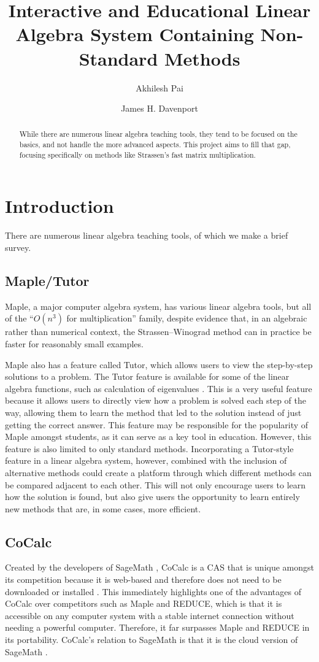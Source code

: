 \documentclass[natbib]{llncs}
\title{Interactive and Educational Linear Algebra System Containing Non-Standard Methods}
\author{Akhilesh Pai\inst{1} \and James H. Davenport\inst{1}}
\institute{
  University of Bath, Bath BA2 7AY, UK\\
  \email{abp43@bath.ac.uk}\\ \email{J.H.Davenport@bath.ac.uk} 
}
\begin{document}
\maketitle

\begin{abstract}
While there are numerous linear algebra teaching tools, they tend to be focused on the basics, and not handle the more advanced aspects. This project aims to fill that gap, focusing specifically on methods like Strassen's fast matrix multiplication.
\end{abstract}
\section{Introduction}
There are numerous linear algebra teaching tools, of which we make a brief survey.
\subsection{Maple/Tutor}
Maple, a major computer algebra system, has various linear algebra tools, but all of the ``$O(n^3)$ for multiplication'' family, despite evidence \cite{Tonksetal2017a} that, in an algebraic rather than numerical context, the Strassen--Winograd \cite{Strassen1969,Winograd1971} method can in practice be faster for reasonably small examples.

Maple also has a feature called Tutor, which allows users to view the step-by-step solutions to a problem. The Tutor feature is available for some of the linear algebra functions, such as calculation of eigenvalues \cite{eigentutor}.  This is a very useful feature because it allows users to directly view how a problem
is solved each step of the way, allowing them to learn the method that led to the solution instead of just
getting the correct answer. This feature may be responsible for the popularity of Maple amongst students,
as it can serve as a key tool in education. However, this feature is also limited to only standard methods.
Incorporating a Tutor-style feature in a linear algebra system, however, combined with the inclusion of
alternative methods could create a platform through which different methods can be compared adjacent
to each other. This will not only encourage users to learn how the solution is found, but also give users
the opportunity to learn entirely new methods that are, in some cases, more efficient.
\subsection{CoCalc}
Created by the developers of SageMath \cite{sagemath}, CoCalc is a CAS that is unique amongst its competition because it is web-based and therefore does not need to be downloaded or installed \cite{cocalc}. This immediately highlights one of the advantages of CoCalc over competitors such as Maple and REDUCE, which is that it is accessible on any computer system with a stable internet connection without needing a powerful computer. Therefore, it far surpasses Maple and REDUCE in its portability. CoCalc's relation to SageMath is that it is the cloud version of SageMath \cite{sagebook}.
\end{document}
